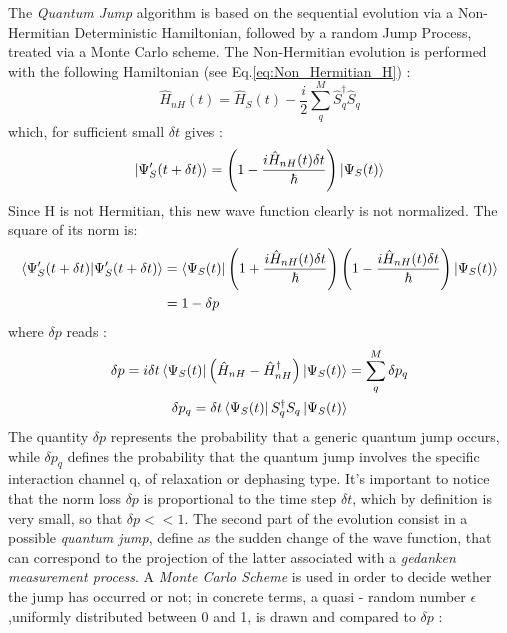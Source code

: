\documentclass[a4paper,12pt]{article}
\begin{document}
	The \textit{Quantum Jump} algorithm is based on the sequential evolution via a Non-Hermitian Deterministic Hamiltonian, followed by a random Jump Process, treated via a Monte Carlo scheme.
	The Non-Hermitian evolution is performed with the following Hamiltonian (see Eq.\ref{eq:Non_Hermitian_H}) : 
	\begin{equation}
		\hat{H}_{nH}(t) = \hat{H}_{S}(t) - \frac{i}{2} \sum_{q}^{M}{\hat{S}^{\dagger}_{q}\hat{S}_{q}}
		\label{eq:specific_Non_Hermitian_H}
	\end{equation}
	which, for sufficient small $ \delta t $ gives : 
	\begin{equation}
		\ket{\Psi_{S}' (t +\delta t)} = \left(1 - \frac{i\hat{H}_{nH}(t) \delta t}{\hbar} \right) \ket{\Psi_{S}(t)}
		\label{eq:Non_Hermitian_evolution}
	\end{equation}
	Since H is not Hermitian, this new wave function clearly is not normalized. The square of its norm is:
	\begin{align}
		\braket{\Psi_{S}' (t +\delta t) | \Psi_{S}' (t +\delta t)} &= \bra{\Psi_{S} (t)} \left(1 + \frac{i\hat{H}_{nH}(t) \delta t}{\hbar} \right) \left(1 - \frac{i\hat{H}_{nH}(t) \delta t}{\hbar} \right) \ket{\Psi_{S}(t)} \notag \\
		& = 1 - \delta p  \label{eq:norm_reduction}
	\end{align}
	where $ \delta p $ reads : 
	\begin{gather}
		\delta p = i \delta t \bra{\Psi_{S}(t)} \left( \hat{H}_{nH} - \hat{H}^{\dagger}_{nH} \right) \ket{\Psi_{S}(t)} = \sum_{q}^{M}{\delta p_{q}} \label{eq:delta_p_definition} \\
		\delta p_{q} = \delta t \bra{\Psi_{S}(t)} S_{q}^{\dagger}S_{q} \ket{\Psi_{S}(t)} \label{eq:delta_p_m_definition}
	\end{gather}
	The quantity $ \delta p $ represents the probability that a generic quantum jump occurs, while $ \delta p_{q} $ defines the probability that the quantum jump involves the specific interaction channel q, of relaxation or dephasing type. \newline
	It's important to notice that the norm loss $ \delta p $ is proportional to the time step $ \delta t $, which by definition is very small, so that $ \delta p << 1 $.
	The second part of the evolution consist in a possible \textit{quantum jump}, define as the sudden change of the wave function, that can correspond to the projection of the latter associated with a \textit{gedanken measurement process}.\newline
	A \textit{Monte Carlo Scheme} is used in order to decide wether the jump has occurred or not; in concrete terms, a quasi - random number $ \epsilon $,uniformly distributed between 0 and 1, is drawn and compared to $ \delta p $ : 
\end{document}
